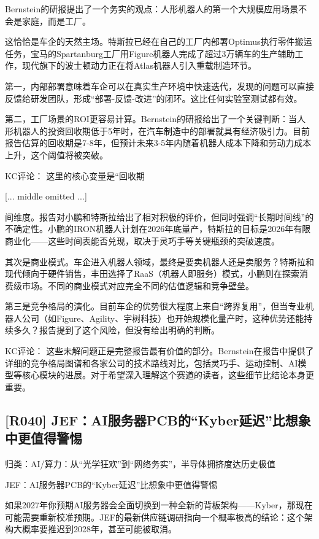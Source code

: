 \documentclass[11pt]{ctexart}
\begin{document}
Bernstein的研报提出了一个务实的观点：人形机器人的第一个大规模应用场景不会是家庭，而是工厂。

这恰恰是车企的天然主场。特斯拉已经在自己的工厂内部署Optimus执行零件搬运任务，宝马的Spartanburg工厂用Figure机器人完成了超过3万辆车的生产辅助工作，现代旗下的波士顿动力正在将Atlas机器人引入重载制造环节。

第一，内部部署意味着车企可以在真实生产环境中快速迭代，发现的问题可以直接反馈给研发团队，形成“部署-反馈-改进”的闭环。这比任何实验室测试都有效。

第二，工厂场景的ROI更容易计算。Bernstein的研报给出了一个关键判断：当人形机器人的投资回收期低于5年时，在汽车制造中的部署就具有经济吸引力。目前报告估算的回收期是7-8年，但预计未来3-5年内随着机器人成本下降和劳动力成本上升，这个阈值将被突破。

KC评论： 这里的核心变量是“回收期

[... middle omitted ...]

间维度。报告对小鹏和特斯拉给出了相对积极的评价，但同时强调“长期时间线”的不确定性。小鹏的IRON机器人计划在2026年底量产，特斯拉的目标是2026年有限商业化——这些时间表能否兑现，取决于灵巧手等关键瓶颈的突破速度。

其次是商业模式。车企进入机器人领域，最终是要卖机器人还是卖服务？特斯拉和现代倾向于硬件销售，丰田选择了RaaS（机器人即服务）模式，小鹏则在探索消费级市场。不同的商业模式对应完全不同的估值逻辑和竞争壁垒。

第三是竞争格局的演化。目前车企的优势很大程度上来自“跨界复用”，但当专业机器人公司（如Figure、Agility、宇树科技）也开始规模化量产时，这种优势还能持续多久？报告提到了这个风险，但没有给出明确的判断。

KC评论： 这些未解问题正是完整报告最有价值的部分。Bernstein在报告中提供了详细的竞争格局图谱和各家公司的技术路线对比，包括灵巧手、运动控制、AI模型等核心模块的进展。对于希望深入理解这个赛道的读者，这些细节比结论本身更重要。

\subsection{[R040] JEF：AI服务器PCB的“Kyber延迟”比想象中更值得警惕}
{\small\color{refgray}归类：AI/算力：从“光学狂欢”到“网络务实”，半导体拥挤度达历史极值}

JEF：AI服务器PCB的“Kyber延迟”比想象中更值得警惕

如果2027年你预期AI服务器会全面切换到一种全新的背板架构——Kyber，那现在可能需要重新校准预期。JEF的最新供应链调研指向一个概率极高的结论：这个架构大概率要推迟到2028年，甚至可能被取消。
\end{document}
